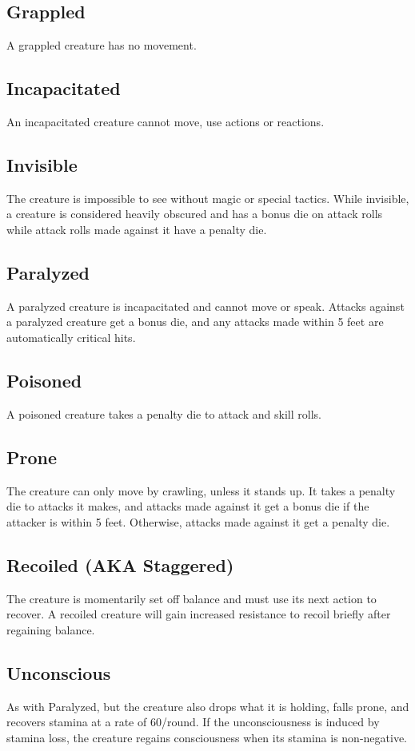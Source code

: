 \documentclass[12pt]{book}
\begin{document}
\subsection{Grappled}
A grappled creature has no movement.

\subsection{Incapacitated}
An incapacitated creature cannot move, use actions or reactions.

\subsection{Invisible}
The creature is impossible to see without magic or special tactics. While invisible, a creature is considered heavily obscured and has a bonus die on attack rolls while attack rolls made against it have a penalty die.

\subsection{Paralyzed}
A paralyzed creature is incapacitated and cannot move or speak. Attacks against a paralyzed creature get a bonus die, and any attacks made within 5 feet are automatically critical hits.

\subsection{Poisoned}
A poisoned creature takes a penalty die to attack and skill rolls.

\subsection{Prone}
The creature can only move by crawling, unless it stands up. It takes a penalty die to attacks it makes, and attacks made against it get a bonus die if the attacker is within 5 feet. Otherwise, attacks made against it get a penalty die.

\subsection{Recoiled (AKA Staggered)}
The creature is momentarily set off balance and must use its next action to recover. A recoiled creature will gain increased resistance to recoil briefly after regaining balance.

\subsection{Unconscious}
As with Paralyzed, but the creature also drops what it is holding, falls prone, and recovers stamina at a rate of 60/round. If the unconsciousness is induced by stamina loss, the creature regains consciousness when its stamina is non-negative.
\end{document}
